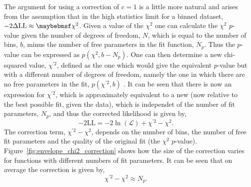 The argument for using a correction of $c=1$ is a little more natural and arises from the assumption that in the high statistics limit for a binned dataset, $\NLL\approx\chi^{2}$. Given a value of the $\chi^{2}$ one can calculate the $\chi^{2}$ $p$-value given the number of degrees of freedom, $N$, which is equal to the number of bins, $b$, minus the number of free parameters in the fit function, $N_{p}$. Thus the $p$-value can be expressed as $p(\chi^{2},b-N_{p})$. One can then determine a new chi-squared value, $\chi^{\prime 2}$, defined as the one which would give the equivalent $p$-value but with a different number of degrees of freedom, namely the one in which there are no free parameters in the fit, $p(\chi^{\prime 2},b)$ . It can be seen that there is now an expression for $\chi^{\prime 2}$, which is approximately equivalent to a new \NLL (now relative to the best possible fit, given the data), which is independet of the number of fit parameters, $N_{p}$, and thus the corrected likelihood is given by,
\begin{equation}
  -2\mathrm{LL} = -2\ln(\mathcal{L}) + \chi^{\prime 2} - \chi^{2}.
\end{equation}
The correction term, $\chi^{\prime 2} -\chi^{2}$, depends on the number of bins, the number of free fit parameters and the quality of the original fit (the $\chi^{2}$ $p$-value). Figure~\ref{fig:envelope_chi2_correction} shows how the size of the correction varies for functions with different numbers of fit parameters. It can be seen that on average the correction is given by,
\begin{equation}
  \chi^{\prime 2} - \chi^{2} \approx N_{p}.
\end{equation}
